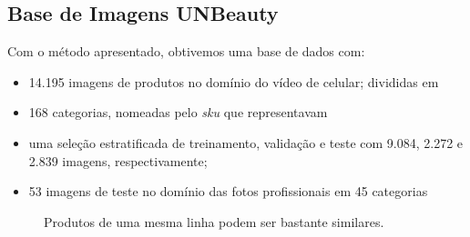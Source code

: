 \documentclass[conference]{IEEEtran}
\begin{document}
\subsection{Base de Imagens UNBeauty}
Com o método apresentado, obtivemos uma base de dados com:
\begin{itemize}
\item 14.195 imagens de produtos no domínio do vídeo de celular; divididas em
\item 168 categorias, nomeadas pelo \textit{sku} que representavam
\item uma seleção estratificada de treinamento, validação e teste com 9.084, 2.272 e 2.839 imagens, respectivamente;
\item 53 imagens de teste no domínio das fotos profissionais em 45 categorias
\end{itemize}
\begin{figure}
\centering
{}\hfil
{}\hfil
{}
\caption{Produtos de uma mesma linha podem ser bastante similares.}\label{parecidos}
\end{figure}
\end{document}
